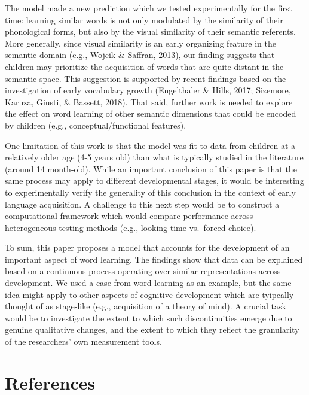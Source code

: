 \documentclass[10pt, letterpaper]{article}
\begin{document}
The model made a new prediction which we tested experimentally for the
first time: learning similar words is not only modulated by the
similarity of their phonological forms, but also by the visual
similarity of their semantic referents. More generally, since visual
similarity is an early organizing feature in the semantic domain (e.g.,
Wojcik \& Saffran, 2013), our finding suggests that children may
prioritize the acquisition of words that are quite distant in the
semantic space. This suggestion is supported by recent findings based on
the investigation of early vocabulary growth (Engelthaler \& Hills,
2017; Sizemore, Karuza, Giusti, \& Bassett, 2018). That said, further
work is needed to explore the effect on word learning of other semantic
dimensions that could be encoded by children (e.g.,
conceptual/functional features).

One limitation of this work is that the model was fit to data from
children at a relatively older age (4-5 years old) than what is
typically studied in the literature (around 14 month-old). While an
important conclusion of this paper is that the same process may apply to
different developmental stages, it would be interesting to
experimentally verify the generality of this conclusion in the context
of early language acquisition. A challenge to this next step would be to
construct a computational framework which would compare performance
across heterogeneous testing methods (e.g., looking time
vs.~forced-choice).

To sum, this paper proposes a model that accounts for the development of
an important aspect of word learning. The findings show that data can be
explained based on a continuous process operating over similar
representations across development. We used a case from word learning as
an example, but the same idea might apply to other aspects of cognitive
development which are tyipcally thought of as stage-like (e.g.,
acquisition of a theory of mind). A crucial task would be to investigate
the extent to which such discontinuities emerge due to genuine
qualitative changes, and the extent to which they reflect the
granularity of the researchers' own measurement tools.

\section{References}\label{references}

\setlength{\parindent}{-0.1in} \setlength{\leftskip}{0.125in} \noindent
\end{document}

